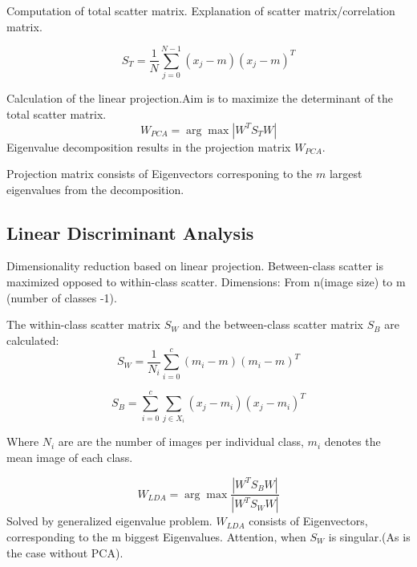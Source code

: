     Computation of total scatter matrix.
    Explanation of scatter matrix/correlation matrix.

    \begin{equation}
    S_T=\frac{1}{N}\sum\limits_{j=0}^{N-1}(x_j-m)(x_j-m)^T
    \end{equation}

    Calculation of the linear projection.Aim is to maximize the determinant
     of the total scatter matrix.
    \begin{equation}
    W_{PCA}=\arg \max |W^T S_T W |
    \end{equation}
    Eigenvalue decomposition results in the projection matrix $W_{PCA}$.

    Projection matrix consists of Eigenvectors corresponing to the $m$
    largest eigenvalues from the decomposition.


  \subsection{Linear Discriminant Analysis}
    Dimensionality reduction based on linear projection.
    Between-class scatter is maximized opposed to within-class scatter.
    Dimensions: From n(image size) to m (number of classes -1).


    The within-class scatter matrix $S_W$ and the between-class scatter matrix $S_B$ are calculated:
    \begin{equation}
      S_W=\frac{1}{N_i}\sum\limits_{i=0}^{c}(m_i-m)(m_i-m)^T
    \end{equation}

    \begin{equation}
      S_B=\sum\limits_{i=0}^{c}\sum\limits_{j \in X_i}(x_j-m_i)(x_j-m_i)^T
    \end{equation}

    Where $N_i$ are are the number of images per individual class, $m_i$ denotes the mean image of
    each class.


    \begin{equation}
      W_{LDA}=\arg \max \frac{|W^T S_B W |}{|W^T S_W W|}
    \end{equation}
    Solved by generalized eigenvalue problem. $W_{LDA}$ consists of Eigenvectors, corresponding
    to the m biggest Eigenvalues.
    Attention, when  $S_W$ is singular.(As is the case without PCA).

